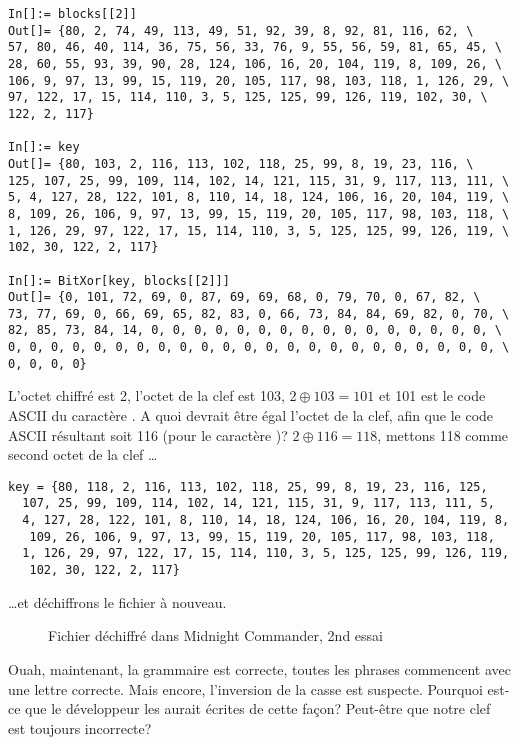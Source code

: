 \begin{lstlisting}[style=custommath]
In[]:= blocks[[2]]
Out[]= {80, 2, 74, 49, 113, 49, 51, 92, 39, 8, 92, 81, 116, 62, \
57, 80, 46, 40, 114, 36, 75, 56, 33, 76, 9, 55, 56, 59, 81, 65, 45, \
28, 60, 55, 93, 39, 90, 28, 124, 106, 16, 20, 104, 119, 8, 109, 26, \
106, 9, 97, 13, 99, 15, 119, 20, 105, 117, 98, 103, 118, 1, 126, 29, \
97, 122, 17, 15, 114, 110, 3, 5, 125, 125, 99, 126, 119, 102, 30, \
122, 2, 117}

In[]:= key
Out[]= {80, 103, 2, 116, 113, 102, 118, 25, 99, 8, 19, 23, 116, \
125, 107, 25, 99, 109, 114, 102, 14, 121, 115, 31, 9, 117, 113, 111, \
5, 4, 127, 28, 122, 101, 8, 110, 14, 18, 124, 106, 16, 20, 104, 119, \
8, 109, 26, 106, 9, 97, 13, 99, 15, 119, 20, 105, 117, 98, 103, 118, \
1, 126, 29, 97, 122, 17, 15, 114, 110, 3, 5, 125, 125, 99, 126, 119, \
102, 30, 122, 2, 117}

In[]:= BitXor[key, blocks[[2]]]
Out[]= {0, 101, 72, 69, 0, 87, 69, 69, 68, 0, 79, 70, 0, 67, 82, \
73, 77, 69, 0, 66, 69, 65, 82, 83, 0, 66, 73, 84, 84, 69, 82, 0, 70, \
82, 85, 73, 84, 14, 0, 0, 0, 0, 0, 0, 0, 0, 0, 0, 0, 0, 0, 0, 0, 0, \
0, 0, 0, 0, 0, 0, 0, 0, 0, 0, 0, 0, 0, 0, 0, 0, 0, 0, 0, 0, 0, 0, 0, \
0, 0, 0, 0}
\end{lstlisting}

L'octet chiffré est 2, l'octet de la clef est 103, $2 \oplus 103=101$ et 101 est
le code ASCII du caractère \q{e}.
A quoi devrait être égal l'octet de la clef, afin que le code ASCII résultant soit
116 (pour le caractère \q{t})?
$2 \oplus 116=118$, mettons 118 comme second octet de la clef \dots

\begin{lstlisting}[style=custommath]
key = {80, 118, 2, 116, 113, 102, 118, 25, 99, 8, 19, 23, 116, 125, 
  107, 25, 99, 109, 114, 102, 14, 121, 115, 31, 9, 117, 113, 111, 5, 
  4, 127, 28, 122, 101, 8, 110, 14, 18, 124, 106, 16, 20, 104, 119, 8,
   109, 26, 106, 9, 97, 13, 99, 15, 119, 20, 105, 117, 98, 103, 118, 
  1, 126, 29, 97, 122, 17, 15, 114, 110, 3, 5, 125, 125, 99, 126, 119,
   102, 30, 122, 2, 117}
\end{lstlisting}

\dots et déchiffrons le fichier à nouveau.

\begin{figure}[H]
\centering
{}
\caption{Fichier déchiffré dans Midnight Commander, 2nd essai}
\end{figure}

Ouah, maintenant, la grammaire est correcte, toutes les phrases commencent avec une lettre
correcte.
Mais encore, l'inversion de la casse est suspecte.
Pourquoi est-ce que le développeur les aurait écrites de cette façon?
Peut-être que notre clef est toujours incorrecte?

